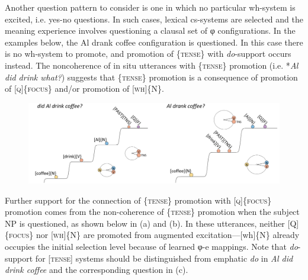   Another question pattern to consider is one in which no particular wh-system is excited, i.e. yes-no questions. In such cases, lexical cs-systems are selected and the meaning experience involves questioning a clausal set of φ configurations. In the examples below, the {\textbar}Al drank coffee{\textbar} configuration is questioned. In this case there is no wh-system to promote, and promotion of \{\textsc{tense}\} with \textit{do}{}-support occurs instead. The noncoherence of in situ utterances with \{\textsc{tense}\} promotion (i.e. *\textit{Al did drink what?}) suggests that \{\textsc{tense}\} promotion is a consequence of promotion of [\textsc{q}]\{\textsc{focus}\} and/or promotion of [\textsc{wh}]\{N\}. 

  
\begin{figure}
\includegraphics[width=\textwidth]{figures/Tilsen-img160.png}
\caption{\missingcaption}
\label{fig:}
\end{figure}
 

  Further support for the connection of \{\textsc{tense}\} promotion with [\textsc{q}]\{\textsc{focus}\} promotion comes from the non-coherence of \{\textsc{tense}\} promotion when the subject NP is questioned, as shown below in (a) and (b). In these utterances, neither [Q]\{\textsc{focus}\} nor [\textsc{wh}]\{N\} are promoted from augmented excitation—[wh]\{N\} already occupies the initial selection level because of learned φ-e mappings. Note that \textit{do}{}-support for [\textsc{tense}] systems should be distinguished from emphatic \textit{do} in \textit{Al did drink coffee} and the corresponding question in (c).  

\ea
  \z
\z

